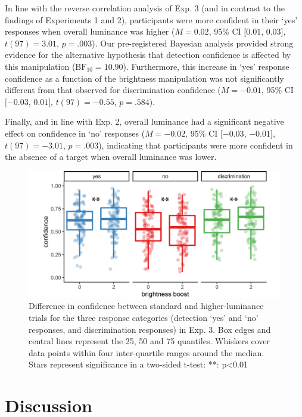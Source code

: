 \documentclass[12pt,twoside]{reedthesis}
\begin{document}
In line with the reverse correlation analysis of Exp. 3 (and in contrast to the findings of Experiments 1 and 2), participants were more confident in their `yes' responses when overall luminance was higher (\(M = 0.02\), 95\% CI \([0.01\), \(0.03]\), \(t(97) = 3.01\), \(p = .003\)). Our pre-registered Bayesian analysis provided strong evidence for the alternative hypothesis that detection confidence is affected by this manipulation (\(\mathrm{BF}_{\textrm{10}} = 10.90\)). Furthermore, this increase in `yes' response confidence as a function of the brightness manipulation was not significantly different from that observed for discrimination confidence (\(M = -0.01\), 95\% CI \([-0.03\), \(0.01]\), \(t(97) = -0.55\), \(p = .584\)).

Finally, and in line with Exp. 2, overall luminance had a significant negative effect on confidence in `no' responses (\(M = -0.02\), 95\% CI \([-0.03\), \(-0.01]\), \(t(97) = -3.01\), \(p = .003\)), indicating that participants were more confident in the absence of a target when overall luminance was lower.


\begin{figure}
\includegraphics[width=\textwidth]{figure/RC/confidence_boost_enhanced} \caption[Difference in confidence between standard and high-luminance trials in Exp. 3]{Difference in confidence between standard and higher-luminance trials for the three response categories (detection `yes' and `no' responses, and discrimination responses) in Exp. 3. Box edges and central lines represent the 25, 50 and 75 quantiles. Whiskers cover data points within four inter-quartile ranges around the median. Stars represent significance in a two-sided t-test: **: p\textless0.01}\label{fig:RC-exp3-conf-boost}
\end{figure}
\hypertarget{discussion-2}{%
\section{Discussion}\label{discussion-2}}
\end{document}
